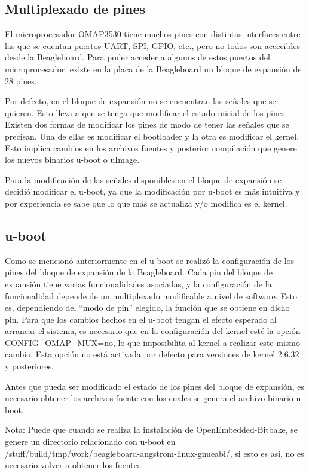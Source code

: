 \subsection{Multiplexado de pines}
El microprocesador OMAP3530 tiene muchos pines con distintas interfaces entre las
que se cuentan puertos UART, SPI, GPIO, etc., pero no todos son accecibles desde la Beagleboard. 
Para poder acceder a algunos de estos puertos del microprocesador, existe en la placa de la
Beagleboard un bloque de expansión de 28 pines.

\bigskip
Por defecto, en el bloque de expansión no se encuentran las señales que se quieren. Esto 
lleva a que se tenga que modificar el estado inicial de los pines. 
Existen dos formas de modificar los pines de modo de tener las señales que se precisan. Una de ellas es modificar el bootloader y la otra es modificar el kernel. Esto implica cambios en los archivos fuentes y posterior compilación que genere los nuevos binarios u-boot o uImage. 

\bigskip
Para la modificación de las señales disponibles en el bloque de expansión se decidió modificar el u-boot, ya que la modificación por u-boot es más intuitiva y por experiencia se sabe que lo que más se actualiza y/o modifica es el kernel. 

\subsection{u-boot}
Como se mencionó anteriormente en el u-boot se realizó la configuración de los pines del bloque de expansión de la Beagleboard. 
Cada pin del bloque de expansión tiene varias funcionalidades asociadas, y la configuración de la 
funcionalidad depende de un multiplexado modificable a nivel de software. Esto es, dependiendo del “modo de pin” elegido, la función que se obtiene en dicho pin.
Para que los cambios hechos en el u-boot tengan el efecto esperado al arrancar el sistema, es necesario que en la configuración del kernel esté la opción CONFIG\_OMAP\_MUX=no, lo que imposibilita al kernel a realizar este mismo cambio. Esta opción no está activada por defecto para versiones de kernel 2.6.32 y posteriores. 

\bigskip
Antes que pueda ser modificado el estado de los pines del bloque de expansión,
es necesario obtener los archivos fuente con los cuales se genera el archivo binario u-boot.

\bigskip
Nota: Puede que cuando se realiza la instalación de OpenEmbedded-Bitbake, se genere un directorio relacionado con u-boot en /stuff/build/tmp/work/beagleboard-angstrom-linux-gnueabi/, si esto es así, no es necesario volver a obtener los fuentes.

